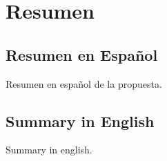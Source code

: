 \chapter*{Resumen}

\section*{Resumen en Español}
Resumen en español de la propuesta.

\section*{Summary in English}
Summary in english.
